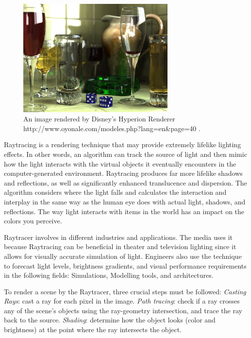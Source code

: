 \documentclass[11pt,a4paper]{article}
\begin{document}
	\begin{figure}[H] 
		\centering
		\includegraphics[width=0.7\textwidth]{1.jpg}
		\caption{\centering An image rendered by Disney's Hyperion Renderer http://www.oyonale.com/modeles.php?lang=en&page=40 \protect\cite{burley2018design}.}
	\end{figure}
	\noindent
	
	
	Raytracing is a rendering technique that may provide extremely lifelike lighting effects. In other words, an algorithm can track the source of light and then mimic how the light interacts with the virtual objects it eventually encounters in the computer-generated environment. Raytracing produces far more lifelike shadows and reflections, as well as significantly enhanced translucence and dispersion. The algorithm considers where the light falls and calculates the interaction and interplay in the same way as the human eye does with actual light, shadows, and reflections. The way light interacts with items in the world has an impact on the colors you perceive.
	
	\vspace*{5px}
	Raytracer involves in different industries and applications. The media uses it because Raytracing can be beneficial in theater and television lighting since it allows for visually accurate simulation of light. Engineers also use the technique to forecast light levels, brightness gradients, and visual performance requirements in the following fields: Simulations, Modelling tools, and architectures. 
	
	\vspace*{5px}
	To render a scene by the Raytracer, three crucial steps must be followed: 
	\textit{Casting Rays}: cast a ray for each pixel in the image.
	\textit{Path tracing}: check if a ray crosses any of the scene's objects using the ray-geometry intersection, and trace the ray back to the source.
	\textit{Shading}: determine how the object looks (color and brightness) at the point where the ray intersects the object.
	
\end{document}
